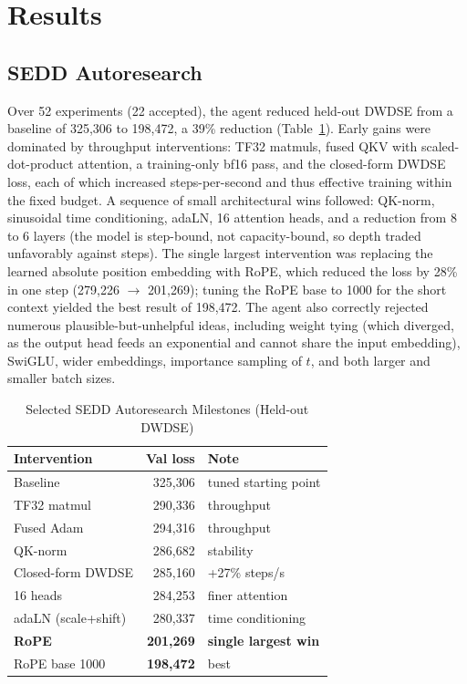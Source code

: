 \documentclass[conference]{IEEEtran}
\begin{document}
\section{Results}

\subsection{SEDD Autoresearch}
Over 52 experiments (22 accepted), the agent reduced held-out DWDSE from
a baseline of 325{,}306 to 198{,}472, a 39\% reduction
(Table~\ref{tab:sedd}). Early gains were dominated by throughput
interventions: TF32 matmuls, fused QKV with scaled-dot-product
attention, a training-only bf16 pass, and the closed-form DWDSE
loss, each of which increased steps-per-second and thus effective
training within the fixed budget. A sequence of small architectural
wins followed: QK-norm, sinusoidal time conditioning, adaLN, 16 attention
heads, and a reduction from 8 to 6 layers (the model is step-bound, not
capacity-bound, so depth traded unfavorably against steps). The single
largest intervention was replacing the learned absolute position
embedding with RoPE, which reduced the loss by 28\% in one step
(279{,}226 $\to$ 201{,}269); tuning the RoPE base to 1000 for the short
context yielded the best result of 198{,}472. The agent also correctly
rejected numerous plausible-but-unhelpful ideas, including weight tying
(which diverged, as the output head feeds an exponential and cannot
share the input embedding), SwiGLU, wider embeddings, importance
sampling of $t$, and both larger and smaller batch sizes.

\begin{table}[t]
\caption{Selected SEDD Autoresearch Milestones (Held-out DWDSE)}
\label{tab:sedd}
\centering
\begin{tabular}{@{}lrl@{}}
\toprule
\textbf{Intervention} & \textbf{Val loss} & \textbf{Note} \\
\midrule
Baseline & 325{,}306 & tuned starting point \\
TF32 matmul & 290{,}336 & throughput \\
Fused Adam & 294{,}316 & throughput \\
QK-norm & 286{,}682 & stability \\
Closed-form DWDSE & 285{,}160 & +27\% steps/s \\
16 heads & 284{,}253 & finer attention \\
adaLN (scale+shift) & 280{,}337 & time conditioning \\
\textbf{RoPE} & \textbf{201{,}269} & \textbf{single largest win} \\
RoPE base 1000 & \textbf{198{,}472} & best \\
\bottomrule
\end{tabular}
\end{table}
\end{document}
